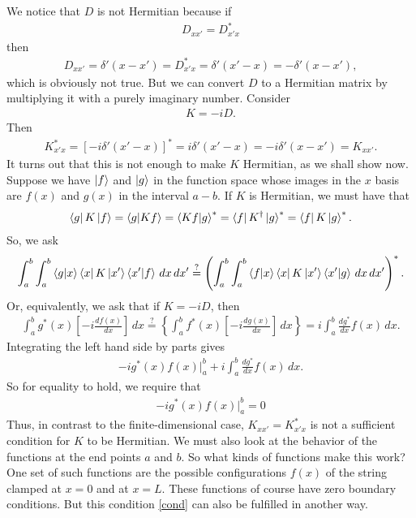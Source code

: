 \documentclass{book}
\theoremstyle{definition}
\newcommand{\f}[2]{\frac{#1}{#2}}
\newcommand{\lp}{\left(}
\newcommand{\rp}{\right)}
\newcommand{\lb}{\left[}
\newcommand{\rb}{\right]}
\begin{document}
We notice that $D$ is not Hermitian because if
\begin{align}
D_{xx'} = D^*_{x'x}
\end{align}
then 
\begin{align}
D_{xx'} = \delta'(x-x') = D^*_{x'x} = \delta'(x'-x) = -\delta'(x-x'),
\end{align}
which is obviously not true. But we can convert $D$ to a Hermitian matrix by multiplying it with a purely imaginary number. Consider
\begin{align}
K = -iD.
\end{align}
Then
\begin{align}
K^*_{x'x} = [-i\delta'(x'-x)]^* = i\delta'(x'-x) = -i\delta'(x-x') = K_{xx'}.
\end{align}
It turns out that this is not enough to make $K$ Hermitian, as we shall show now. Suppose we have $\ket{f}$ and $\ket{g}$ in the function space whose images in the $x$ basis are $f(x)$ and $g(x)$ in the interval $a-b$. If $K$ is Hermitian, we must have that
\begin{align}
\bra{g}K\ket{f} = \bra{g}\ket{Kf} = \bra{Kf}\ket{g}^* = \bra{f}K^\dagger\ket{g}^* = \bra{f}K\ket{g}^*.
\end{align}
So, we ask
\begin{align}
\int^b_a \int^b_a \braket{g}{x}\bra{x}K\ket{x'}\braket{x'}{f}\,dx\,dx'  \stackrel{?}{=} \lp \int^b_a\int^b_a   \braket{f}{x}\bra{x}K\ket{x'}\braket{x'}{g}\,dx\,dx'  \rp^*.
\end{align}
Or, equivalently, we ask that if $K = -iD$, then
\begin{align}
 \int^b_a g^*(x)\lb -i\f{df(x)}{dx} \rb \,dx  \stackrel{?}{=}    \left\{ \int^b_a  f^*(x)\lb -i\f{dg(x)}{dx} \rb\,dx  \right\} = i\int^b_a \f{dg^*}{dx}f(x)\,dx.
\end{align}
Integrating the left hand side by parts gives
\begin{align}
-ig^*(x)f(x)\bigg\vert^b_a + i \int^b_a \f{dg^*}{dx}f(x)\,dx.
\end{align}
So for equality to hold, we require that 
\begin{align}\label{cond}
\boxed{-ig^*(x)f(x)\bigg\vert^b_a= 0}
\end{align}
Thus, in contrast to the finite-dimensional case, $K_{xx'} = K^*_{x'x}$ is not a sufficient condition for $K$ to be Hermitian. We must also look at the behavior of the functions at the end points $a$ and $b$. So what kinds of functions make this work? One set of such functions are the possible configurations $f(x)$ of the string clamped at $x=0$ and at $x=L$. These functions of course have zero boundary conditions. But this condition \eqref{cond} can also be fulfilled in another way. \\
\end{document}
